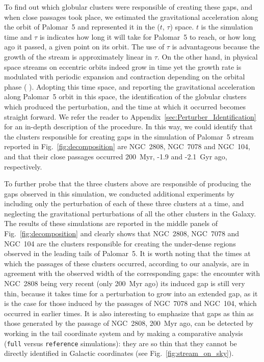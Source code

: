 \documentclass[draft]{aa}
\begin{document}
    To find out which globular clusters were responsible of creating these gaps, and when close passages took place, we estimated the gravitational acceleration along the orbit of Palomar~5 and represented it in the ($t$, $\tau$) space. $t$ is the simulation time and $\tau$ is indicates how long it will take for Palomar~5 to reach, or how  long ago it passed, a given point on its orbit. The use of $\tau$ is advantageous because the growth of the stream is approximately linear in $\tau$. On the other hand, in physical space streams on eccentric orbits indeed grow in time yet the growth rate is modulated with periodic expansion and contraction depending on the orbital phase ( \citep[see the top panel of Fig.~5.][for an example]{2016MNRAS.457.3817S}). Adopting this time space, and reporting the gravitational acceleration along Palomar~5 orbit in this space, the identification of the globular clusters which produced the perturbation, and the time at which it occurred becomes straight forward. We refer the reader to Appendix~\ref{sec:Perturber_Identification} for an in-depth description of the procedure. In this way, we could identify that the clusters responsible for creating gaps in the simulation of Palomar~5 stream reported in Fig.~\ref{fig:decomposition} are NGC~2808, NGC~7078 and NGC~104, and that their close passages occurred 200~Myr, -1.9 and -2.1~Gyr ago, respectively. 
    
    To further probe that the three clusters above are responsible of producing the gaps observed in this simulation, we conducted additional experiments by including only the perturbation of each of these three clusters at a time, and neglecting the gravitational perturbations of all the other clusters in the Galaxy. The results of these simulations are reported in the middle panels of Fig.~\ref{fig:decomposition} and clearly shows that NGC~2808, NGC~7078 and NGC~104 are the clusters responsible for creating the under-dense regions observed in the leading tails of Palomar~5. It is worth noting that the times at which the passages of these clusters occurred, according to our analysis, are in agreement with the observed width of the corresponding gaps: the encounter with NGC~2808 being very recent (only 200~Myr ago) its induced gap is still very thin, because it takes time for a perturbation to grow into an extended gap, as it is the case for those induced by the passages of  NGC~7078 and NGC~104, which occurred in earlier times. It is also interesting to emphasize that gaps as thin as those generated by the passage of NGC~2808, 200~Myr ago, can be detected by working in the tail coordinate system and by making a comparative analysis (\texttt{full} versus \texttt{reference} simulations): they are so thin that they cannot be directly identified in Galactic coordinates (see Fig.~\ref{fig:stream_on_sky}).\\
\end{document}
